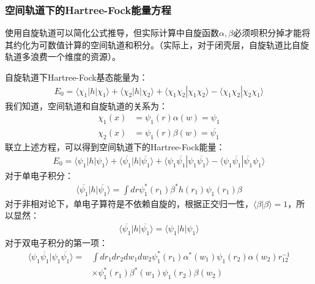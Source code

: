 \documentclass[12pt, a4paper, oneside]{ctexart}
\begin{document}
\subsubsection{空间轨道下的Hartree-Fock能量方程}
使用自旋轨道可以简化公式推导，但实际计算中自旋函数$\alpha,\beta$必须呗积分掉才能将其约化为可数值计算的空间轨道和积分。（实际上，对于闭壳层，自旋轨道比自旋轨道多浪费一个维度的资源）。\par
自旋轨道下Hartree-Fock基态能量为：
\begin{equation}
\begin{aligned}
E_0=\langle \chi_1|h|\chi_1\rangle+\langle \chi_2|h|\chi_2\rangle+\langle \chi_1\chi_2|\chi_1\chi_2\rangle-\langle \chi_1\chi_2|\chi_2\chi_1\rangle
\end{aligned}
\end{equation}
我们知道，空间轨道和自旋轨道的关系为：
\begin{equation}
\begin{aligned}
\chi_1(x)&=\psi_1(r)\alpha(w)=\psi_1 \\
\chi_2(x)&=\psi_1(r)\beta(w)=\overline{\psi_1}
\end{aligned}
\end{equation}
联立上述方程，可以得到空间轨道下的Hartree-Fock能量：
\begin{equation}
\begin{aligned}
E_0=\langle \psi_1|h|\psi_1\rangle+\langle \overline{\psi_1}|h|\overline{\psi_1}\rangle+\langle \psi_1\overline{\psi_1}|\psi_1\overline{\psi_1}\rangle-\langle \psi_1\overline{\psi_1}|\overline{\psi_1}\psi_1\rangle
\end{aligned}
\end{equation}
对于单电子积分：
\begin{equation}
\begin{aligned}
\langle \overline{\psi_1}|h|\overline{\psi_1}\rangle=\int dr\psi_1^*(r_1)\beta^*h(r_1)\psi_1(r_1)\beta
\end{aligned}
\end{equation}
对于非相对论下，单电子算符是不依赖自旋的，根据正交归一性，$\langle \beta|\beta\rangle=1$，所以显然：
\begin{equation}
\begin{aligned}
\langle \overline{\psi_1}|h|\overline{\psi_1}\rangle=\langle \psi_1|h|\psi_1\rangle
\end{aligned}
\end{equation}
对于双电子积分的第一项：
\begin{equation}
\begin{aligned}
\langle \psi_1\overline{\psi_1}|\psi_1\overline{\psi_1}\rangle=&\int dr_1dr_2dw_1dw_2\psi_1^*(r_1)\alpha^*(w_1)\psi_1(r_2)\alpha(w_2) r_{12}^{-1}\\
&\times\psi_1^*(r_1)\beta^*(w_1)\psi_1(r_2)\beta(w_2)
\end{aligned}
\end{equation}
\end{document}
